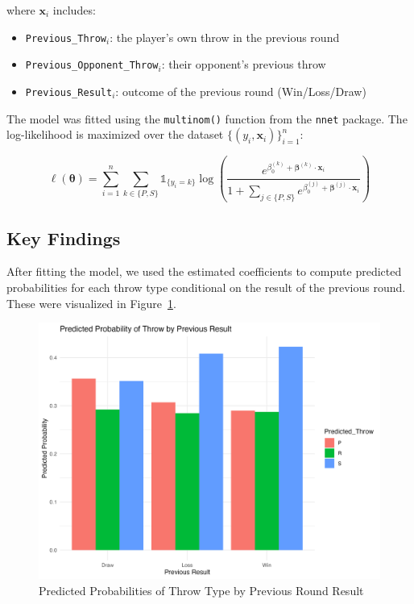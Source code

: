 \documentclass[12pt]{article}
\begin{document}
where $\mathbf{x}_i$ includes:
\begin{itemize}
  \item \texttt{Previous\_Throw}$_i$: the player's own throw in the previous round
  \item \texttt{Previous\_Opponent\_Throw}$_i$: their opponent's previous throw
  \item \texttt{Previous\_Result}$_i$: outcome of the previous round (Win/Loss/Draw)
\end{itemize}

The model was fitted using the \texttt{multinom()} function from the \texttt{nnet} package. The log-likelihood is maximized over the dataset $\{(y_i, \mathbf{x}_i)\}_{i=1}^{n}$:

\[
\ell(\boldsymbol{\theta}) = \sum_{i=1}^{n} \sum_{k \in \{P,S\}} \mathbb{1}_{\{y_i = k\}} \log\left(\frac{e^{\beta_0^{(k)} + \boldsymbol{\beta}^{(k)} \cdot \mathbf{x}_i}}{1 + \sum_{j \in \{P,S\}} e^{\beta_0^{(j)} + \boldsymbol{\beta}^{(j)} \cdot \mathbf{x}_i}}\right)
\]

\subsection*{Key Findings}

After fitting the model, we used the estimated coefficients to compute predicted probabilities for each throw type conditional on the result of the previous round. These were visualized in Figure~\ref{fig:pred_probs}.

\begin{figure}[H]
  \centering
  \includegraphics[width=0.8\linewidth]{figures/predicted_throw_probabilities_by_result.png}
  \caption{Predicted Probabilities of Throw Type by Previous Round Result}
  \label{fig:pred_probs}
\end{figure}
\end{document}
